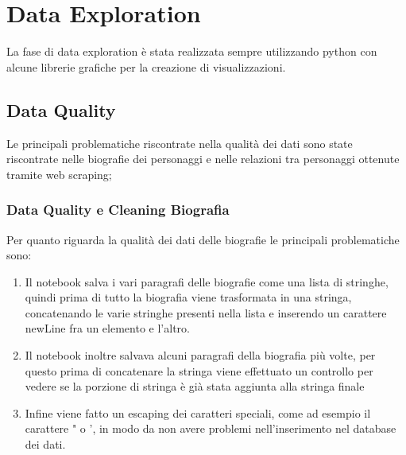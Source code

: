 \documentclass[
12pt, %
a4paper, %
oneside, %
headinclude,footinclude, %
BCOR5mm, %
]{scrartcl}
\begin{document}
\section{Data Exploration}
La fase di data exploration è stata realizzata sempre utilizzando python con alcune librerie grafiche per la creazione di visualizzazioni.

\subsection{Data Quality}
Le principali problematiche riscontrate nella qualità dei dati sono state riscontrate nelle biografie dei personaggi e nelle relazioni tra personaggi ottenute tramite web scraping;
\subsubsection{Data Quality e Cleaning Biografia}
Per quanto riguarda la qualità dei dati delle biografie le principali problematiche sono:
\begin{enumerate}
	\item Il notebook salva i vari paragrafi delle biografie come una lista di stringhe, quindi prima di tutto la biografia viene trasformata in una stringa, concatenando le varie stringhe presenti nella lista e inserendo un carattere newLine fra un elemento e l'altro.
	\item Il notebook inoltre salvava alcuni paragrafi della biografia più volte, per questo prima di concatenare la stringa viene effettuato un controllo per vedere se la porzione di stringa è già stata aggiunta alla stringa finale
	\item Infine viene fatto un escaping dei caratteri speciali, come ad esempio il carattere " o ', in modo da non avere problemi nell'inserimento nel database dei dati.
\end{enumerate}
\end{document}
